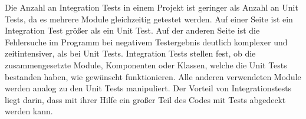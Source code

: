 Die Anzahl an Integration Tests in einem Projekt ist geringer als Anzahl an Unit Tests, da es mehrere Module gleichzeitig getestet werden.
Auf einer Seite ist ein Integration Test größer als ein Unit Test. 
Auf der anderen Seite ist die Fehlersuche im Programm bei negativem Testergebnis deutlich komplexer und zeitintensiver, 
als bei Unit Tests.
Integration Tests stellen fest, ob die zusammengesetzte Module, Komponenten oder Klassen, welche die Unit Tests bestanden haben, wie gewünscht funktionieren.
Alle anderen verwendeten Module werden analog zu den Unit Tests manipuliert.
Der Vorteil von Integrationstests liegt darin, dass mit ihrer Hilfe ein großer Teil des Codes mit Tests abgedeckt werden kann.